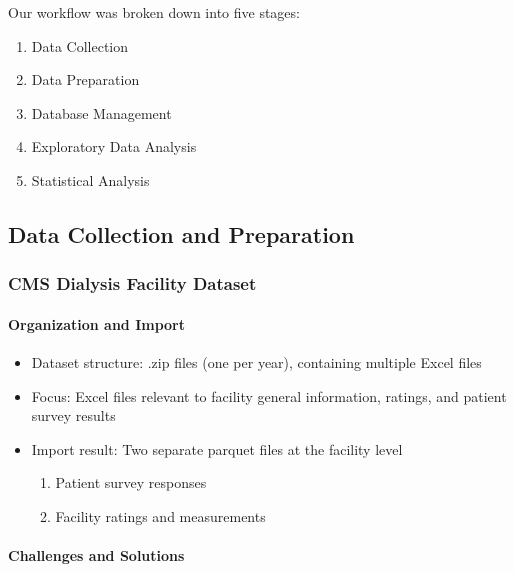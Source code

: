 \documentclass[
  11pt,
  letterpaper,
  DIV=11,
  numbers=noendperiod]{scrartcl}
\let\oldparagraph\paragraph
\renewcommand{\paragraph}[1]{\oldparagraph{#1}\mbox{}}
\providecommand{\tightlist}{%
  \setlength{\itemsep}{0pt}\setlength{\parskip}{0pt}}\usepackage{longtable,booktabs,array}
\begin{document}
Our workflow was broken down into five stages:

\begin{enumerate}
\def\labelenumi{\arabic{enumi}.}
\tightlist
\item
  Data Collection
\item
  Data Preparation
\item
  Database Management
\item
  Exploratory Data Analysis
\item
  Statistical Analysis
\end{enumerate}

\subsection{Data Collection and
Preparation}\label{data-collection-and-preparation}

\subsubsection{CMS Dialysis Facility
Dataset}\label{cms-dialysis-facility-dataset}

\paragraph{Organization and Import}\label{organization-and-import}

\begin{itemize}
\tightlist
\item
  Dataset structure: .zip files (one per year), containing multiple
  Excel files
\item
  Focus: Excel files relevant to facility general information, ratings,
  and patient survey results
\item
  Import result: Two separate parquet files at the facility level

  \begin{enumerate}
  \def\labelenumi{\arabic{enumi}.}
  \tightlist
  \item
    Patient survey responses
  \item
    Facility ratings and measurements
  \end{enumerate}
\end{itemize}

\paragraph{Challenges and Solutions}\label{challenges-and-solutions}
\end{document}
